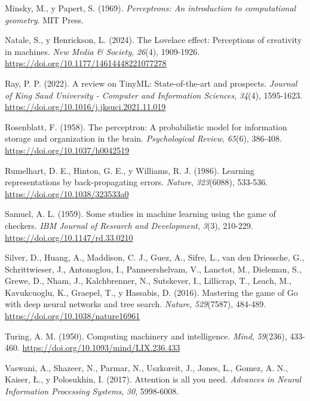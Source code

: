 \documentclass[12pt,letterpaper,oneside]{article}
\newenvironment{referencias}
  {\begin{list}{}{%
      \setlength{\leftmargin}{1.25cm}%
      \setlength{\itemindent}{-1.25cm}%
      \setlength{\itemsep}{0.6em}%
      \setlength{\parsep}{0pt}}%
   \setstretch{1.1}}
  {\end{list}}
\begin{document}
\begin{referencias}
\item Minsky, M., y Papert, S. (1969). \textit{Perceptrons: An introduction to computational geometry}. MIT Press.

\item Natale, S., y Henrickson, L. (2024). The Lovelace effect: Perceptions of creativity in machines. \textit{New Media \& Society}, \textit{26}(4), 1909-1926. \url{https://doi.org/10.1177/14614448221077278}

\item Ray, P. P. (2022). A review on TinyML: State-of-the-art and prospects. \textit{Journal of King Saud University - Computer and Information Sciences}, \textit{34}(4), 1595-1623. \url{https://doi.org/10.1016/j.jksuci.2021.11.019}

\item Rosenblatt, F. (1958). The perceptron: A probabilistic model for information storage and organization in the brain. \textit{Psychological Review}, \textit{65}(6), 386-408. \url{https://doi.org/10.1037/h0042519}

\item Rumelhart, D. E., Hinton, G. E., y Williams, R. J. (1986). Learning representations by back-propagating errors. \textit{Nature}, \textit{323}(6088), 533-536. \url{https://doi.org/10.1038/323533a0}

\item Samuel, A. L. (1959). Some studies in machine learning using the game of checkers. \textit{IBM Journal of Research and Development}, \textit{3}(3), 210-229. \url{https://doi.org/10.1147/rd.33.0210}

\item Silver, D., Huang, A., Maddison, C. J., Guez, A., Sifre, L., van den Driessche, G., Schrittwieser, J., Antonoglou, I., Panneershelvam, V., Lanctot, M., Dieleman, S., Grewe, D., Nham, J., Kalchbrenner, N., Sutskever, I., Lillicrap, T., Leach, M., Kavukcuoglu, K., Graepel, T., y Hassabis, D. (2016). Mastering the game of Go with deep neural networks and tree search. \textit{Nature}, \textit{529}(7587), 484-489. \url{https://doi.org/10.1038/nature16961}

\item Turing, A. M. (1950). Computing machinery and intelligence. \textit{Mind}, \textit{59}(236), 433-460. \url{https://doi.org/10.1093/mind/LIX.236.433}

\item Vaswani, A., Shazeer, N., Parmar, N., Uszkoreit, J., Jones, L., Gomez, A. N., Kaiser, Ł., y Polosukhin, I. (2017). Attention is all you need. \textit{Advances in Neural Information Processing Systems}, \textit{30}, 5998-6008.


\end{referencias}
\end{document}
